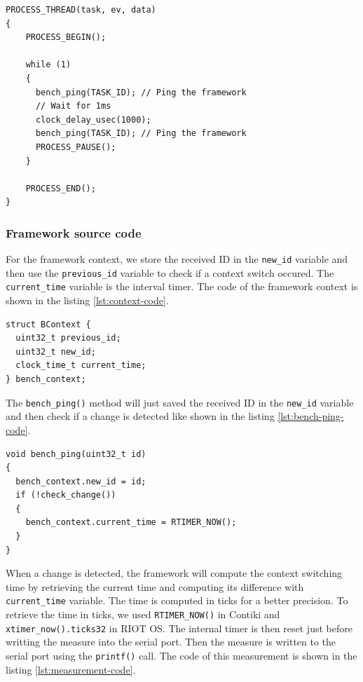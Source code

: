 \begin{lstlisting}[float, style=CStyle, label={lst:bench-task-code}, caption={Source code of the application task with \texttt{bench\_ping()} calls}]
PROCESS_THREAD(task, ev, data)
{
    PROCESS_BEGIN();

    while (1)
    {
      bench_ping(TASK_ID); // Ping the framework
      // Wait for 1ms
      clock_delay_usec(1000);
      bench_ping(TASK_ID); // Ping the framework
      PROCESS_PAUSE();
    }

    PROCESS_END();
}
\end{lstlisting}

\subsubsection{Framework source code}

For the framework context, we store the received ID in the \texttt{new\_id} variable 
  and then use the \texttt{previous\_id} variable to check if a context switch occured.
The \texttt{current\_time} variable is the interval timer.
The code of the framework context is shown in the listing \ref{lst:context-code}.

\begin{lstlisting}[style=CStyle, float, label={lst:context-code}, caption={Framework context implementation}]
struct BContext {
  uint32_t previous_id;
  uint32_t new_id;
  clock_time_t current_time;
} bench_context;
\end{lstlisting}

The \texttt{bench\_ping()} method will just saved the received ID in the \texttt{new\_id} variable 
  and then check if a change is detected like shown in the listing \ref{lst:bench-ping-code}.

\begin{lstlisting}[style=CStyle, float, label={lst:bench-ping-code}, caption={\texttt{bench\_ping()} implementation}]
void bench_ping(uint32_t id)
{
  bench_context.new_id = id;
  if (!check_change())
  {
    bench_context.current_time = RTIMER_NOW();
  }
}
\end{lstlisting}

When a change is detected, the framework will compute the context switching time 
  by retrieving the current time and computing its difference with \texttt{current\_time} variable.
The time is computed in ticks for a better precision.
To retrieve the time in ticks, we used \texttt{RTIMER\_NOW()} in Contiki and \texttt{xtimer\_now().ticks32} in RIOT OS.
The internal timer is then reset just before writting the measure into the serial port.
Then the measure is written to the serial port using the \texttt{printf()} call.
The code of this measurement is shown in the listing \ref{lst:measurement-code}.

